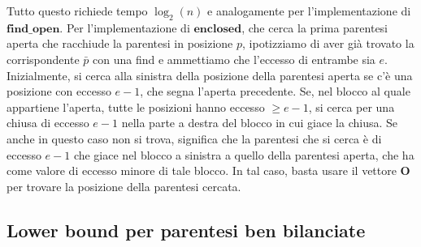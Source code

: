 Tutto questo richiede tempo $\log_2(n)$ e analogamente per l'implementazione di $\mathbf{find\_open}$.
Per l'implementazione di $\mathbf{enclosed}$, che cerca la prima parentesi aperta che racchiude la parentesi
in posizione $p$, ipotizziamo di aver già trovato la corrispondente $\bar{p}$ con una find e ammettiamo che
l'eccesso di entrambe sia $e$. Inizialmente, si cerca alla sinistra della posizione della parentesi aperta
se c'è una posizione con eccesso $e-1$, che segna l'aperta precedente. Se, nel blocco al quale appartiene
l'aperta, tutte le posizioni hanno eccesso $\ge e-1$, si cerca per una chiusa di eccesso $e-1$ nella parte
a destra del blocco in cui giace la chiusa. Se anche in questo caso non si trova, significa che la parentesi
che si cerca è di eccesso $e-1$ che giace nel blocco a sinistra a quello della parentesi aperta, che ha
come valore di eccesso minore di tale blocco. In tal caso, basta usare il vettore $\mathbf{O}$ per trovare
la posizione della parentesi cercata.

\subsection{Lower bound per parentesi ben bilanciate}
